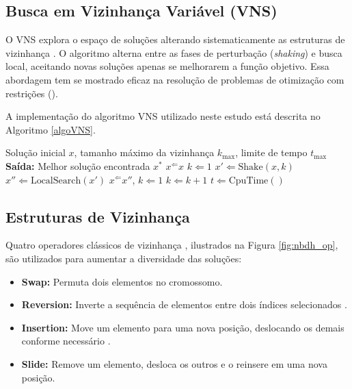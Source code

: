 \documentclass[conference]{IEEEtran}
\begin{document}
\subsection{Busca em Vizinhança Variável (VNS)}
O VNS explora o espaço de soluções alterando sistematicamente as estruturas de vizinhança \cite{b27}. O algoritmo alterna entre as fases de perturbação 
(\textit{shaking}) e busca local, aceitando novas soluções apenas se melhorarem a função objetivo. Essa abordagem tem se mostrado eficaz na resolução de problemas de otimização com restrições (\hspace{-0.03em}\cite{b9,b14,b15}).

A implementação do algoritmo VNS utilizado neste estudo está descrita no Algoritmo \ref{algoVNS}.

\begin{algorithm}
    \caption{Busca em Vizinhança Variável (VNS)}
    \label{algoVNS}
    \begin{algorithmic}[1]
    \Require Solução inicial $x$, tamanho máximo da vizinhança $k_{\text{max}}$, limite de tempo $t_{\text{max}}$
    \State \textbf{Saída:} Melhor solução encontrada $x^*$
    \State $x^ \Leftarrow x$
    \Repeat
    \State $k \Leftarrow 1$
    \Repeat
    \State $x' \Leftarrow \text{Shake}(x, k)$
    \State $x'' \Leftarrow \text{LocalSearch}(x')$
    \State $x^ \Leftarrow x''$, $k \Leftarrow 1$
    \Else
    \State $k \Leftarrow k + 1$
    \EndIf
    \State $t \Leftarrow \text{CpuTime}()$
    \end{algorithmic}
\end{algorithm}

\subsection{Estruturas de Vizinhança}
Quatro operadores clássicos de vizinhança \cite{b7}, ilustrados na Figura \ref{fig:nbdh_op}, são utilizados para aumentar a diversidade das soluções:

\begin{itemize}
\item \textbf{Swap:} Permuta dois elementos no cromossomo.
\item \textbf{Reversion:} Inverte a sequência de elementos entre dois índices selecionados \cite{b17}.
\item \textbf{Insertion:} Move um elemento para uma nova posição, deslocando os demais conforme necessário \cite{b16}.
\item \textbf{Slide:} Remove um elemento, desloca os outros e o reinsere em uma nova posição.
\end{itemize}
\end{document}

